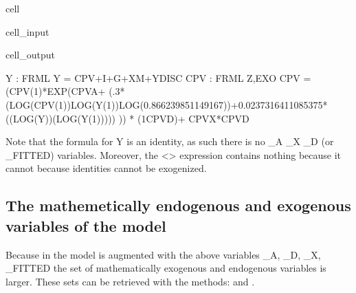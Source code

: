 \documentclass[letterpaper,10pt,english]{jupyterBook}
\begin{document}
\begin{sphinxuseclass}{cell}\begin{sphinxVerbatimInput}

\begin{sphinxuseclass}{cell_input}
\begin{sphinxVerbatim}[commandchars=\\\{\}]
\PYG{p}{[}\PYG{p}{]}
\end{sphinxVerbatim}

\end{sphinxuseclass}\end{sphinxVerbatimInput}
\begin{sphinxVerbatimOutput}

\begin{sphinxuseclass}{cell_output}
\begin{sphinxVerbatim}[commandchars=\\\{\}]
Y   : FRML \PYGZlt{}\PYGZgt{} Y = CPV+I+G+X\PYGZhy{}M+YDISC \PYGZdl{}
CPV : FRML \PYGZlt{}Z,EXO\PYGZgt{} CPV = (CPV(\PYGZhy{}1)*EXP(CPV\PYGZus{}A+ (\PYGZhy{}.3*(LOG(CPV(\PYGZhy{}1))\PYGZhy{}LOG(Y(\PYGZhy{}1))\PYGZhy{}LOG(0.866239851149167))+0.0237316411085375*((LOG(Y))\PYGZhy{}(LOG(Y(\PYGZhy{}1))))) )) * (1\PYGZhy{}CPV\PYGZus{}D)+ CPV\PYGZus{}X*CPV\PYGZus{}D \PYGZdl{}
\end{sphinxVerbatim}

\end{sphinxuseclass}\end{sphinxVerbatimOutput}

\end{sphinxuseclass}
\sphinxAtStartPar
Note that the formula for Y is an identity, as such there is no \_A \_X \_D (or \_FITTED) variables. Moreover, the <> expression contains  nothing  because it cannot because identities cannot be exogenized.


\subsection{The mathemetically endogenous and exogenous variables of the model}
\label{\detokenize{content/05_SimpleModel/SimpleModel:the-mathemetically-endogenous-and-exogenous-variables-of-the-model}}
\sphinxAtStartPar
Because in  the  model is augmented with the above variables \_A, \_D, \_X, \_FITTED the set of mathematically exogenous and endogenous variables is larger.  These sets can be retrieved with the methods:  and .
\end{document}
